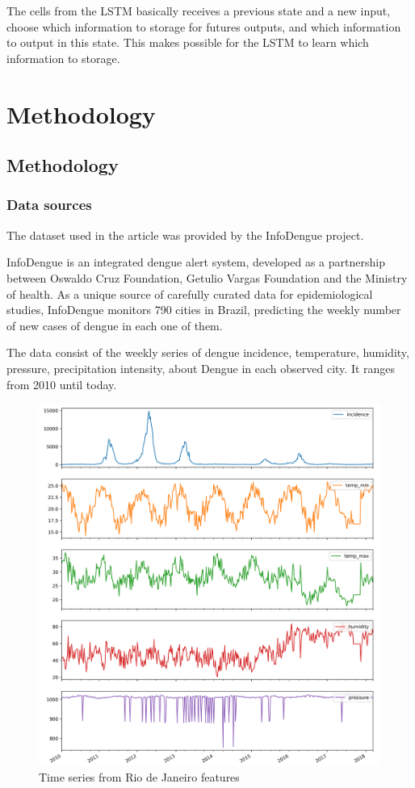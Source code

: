 \documentclass[12pt]{report}
\begin{document}
The cells from the LSTM basically receives a previous state and a new input, choose which information to storage for futures outputs, and which information to output in this state.
This makes possible for the LSTM to learn which information to storage.

\newpage	
\chapter{Methodology}

\section{Methodology}


\subsection{Data sources}
The dataset used in the article was provided by the InfoDengue project. 

InfoDengue \citet{codeco2016infodengue} is an integrated dengue alert system, developed as a partnership between Oswaldo Cruz Foundation, Getulio Vargas Foundation and the Ministry of health. As a unique source of carefully curated data for epidemiological studies, InfoDengue monitors 790 cities in Brazil, predicting the weekly number of new cases of dengue in each one of them.

The data consist of the weekly series of dengue incidence,  temperature, humidity, pressure, precipitation intensity, about Dengue in each observed city. It ranges from 2010 until today.

\begin{figure}[h!]
 \centering
 \includegraphics[width=\textwidth]{rio_raw_series.png}
 \caption{Time series from Rio de Janeiro features}
 \label{fig: rio_raw}
\end{figure}
\end{document}
